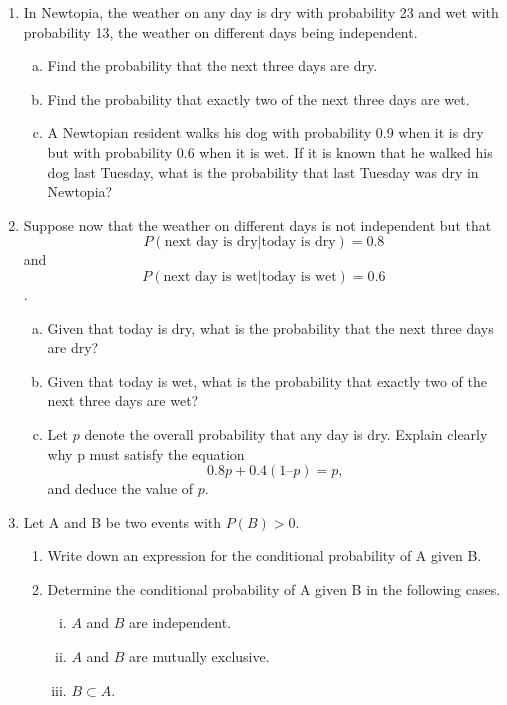 \documentclass[a4paper,12pt]{article}
\begin{document}
\begin{enumerate}
\item  In Newtopia, the weather on any day is dry with probability 23 and wet with probability 13, the weather on different days being independent.
\begin{enumerate}[(a)]

\item Find the probability that the next three days are dry.
\item Find the probability that exactly two of the next three days are wet.
\item A Newtopian resident walks his dog with probability 0.9 when it is dry but with probability 0.6 when it is wet. If it is known that he walked his dog last Tuesday, what is the probability that last Tuesday was dry in Newtopia?
\end{enumerate}

\item  Suppose now that the weather on different days is not independent but that
$$P(\mbox{next day is dry} | \mbox{today is dry}) = 0.8$$
and $$P(\mbox{next day is wet} | \mbox{today is wet}) = 0.6$$.
\begin{enumerate}[(a)]

\item  Given that today is dry, what is the probability that the next three days are dry?

\item Given that today is wet, what is the probability that exactly two of the next three days are wet?
\item  Let $p$ denote the overall probability that any day is dry. Explain clearly why p must satisfy the equation
$$0.8p + 0.4(1 – p) = p,$$
and deduce the value of $p$.
\end{enumerate}



\item  Let A and B be two events with $P(B) > 0$.
\begin{enumerate}
\item  Write down an expression for the conditional probability of A given B.
\item Determine the conditional probability of A given B in the following
cases.
\begin{enumerate}[(i)]
\item $A$ and $B$ are independent.
\item $A$ and $B$ are mutually exclusive.
\item $B \subset A$.
\end{enumerate}


\end{enumerate}
\end{enumerate}
\end{document}
